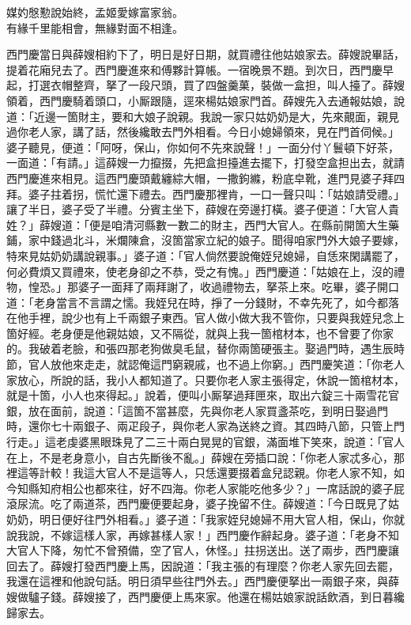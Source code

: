 \begin{myquote} 
媒妁慇懃說始終，孟姬愛嫁富家翁。\\有緣千里能相會，無緣對面不相逢。
\end{myquote} 

西門慶當日與薛嫂相約下了，明日是好日期，就買禮往他姑娘家去。薛嫂說畢話，提着花廂兒去了。西門慶進來和傅夥計算帳。一宿晚景不題。到次日，西門慶早起，打選衣帽整齊，拏了一段尺頭，買了四盤羹菓，裝做一盒担，叫人擡了。薛嫂領着，西門慶騎着頭口，小厮跟隨，逕來楊姑娘家門首。薛嫂先入去通報姑娘，說道：「近邊一箇財主，{}要和大娘子說親。我說一家只姑奶奶是大，先來覿面，親見過你老人家，講了話，{}然後纔敢去門外相看。今日小媳婦領來，見在門首伺候。」婆子聽見，便道：「阿呀，{}保山，你如何不先來說聲！」一面分付丫鬟頓下好茶，一面道：「有請。」這薛嫂一力攛掇，先把盒担擡進去擺下，打發空盒担出去，就請西門慶進來相見。這西門慶頭戴纏綜大帽，一撒鉤縧，粉底皁靴，進門見婆子拜四拜。婆子拄着拐，慌忙還下禮去。西門慶那裡肯，一口一聲只叫：「姑娘請受禮。」讓了半日，婆子受了半禮。分賓主坐下，薛嫂在旁邊打橫。婆子便道：「大官人貴姓？」薛嫂道：「便是咱清河縣數一數二的財主，西門大官人。在縣前開箇大生藥鋪，家中錢過北斗，米爛陳倉，沒箇當家立紀的娘子。聞得咱家門外大娘子要嫁，特來見姑奶奶講說親事。」婆子道：「官人倘然要說俺姪兒媳婦，自恁來閑講罷了，何必費煩又買禮來，使老身卻之不恭，受之有愧。」西門慶道：「姑娘在上，沒的禮物，惶恐。」那婆子一面拜了兩拜謝了，收過禮物去，拏茶上來。吃畢，婆子開口道：「老身當言不言謂之懦。{}我姪兒在時，掙了一分錢財，不幸先死了，如今都落在他手裡，說少也有上千兩銀子東西。官人做小做大我不管你，只要與我姪兒念上箇好經。老身便是他親姑娘，又不隔從，就與上我一箇棺材本，也不曾要了你家的。我破着老臉，和張四那老狗做臭毛鼠，替你兩箇硬張主。娶過門時，遇生辰時節，官人放他來走走，就認俺這門窮親戚，也不過上你窮。」{}西門慶笑道：「你老人家放心，所說的話，我小人都知道了。只要你老人家主張得定，休說一箇棺材本，就是十箇，小人也來得起。」說着，便叫小厮拏過拜匣來，取出六錠三十兩雪花官銀，放在面前，說道：「這箇不當甚麼，先與你老人家買盞茶吃，到明日娶過門時，還你七十兩銀子、兩疋段子，與你老人家為送終之資。其四時八節，只管上門行走。」這老虔婆黑眼珠見了二三十兩白晃晃的官銀，滿面堆下笑來，說道：「官人在上，不是老身意小，自古先斷後不亂。」薛嫂在旁插口說：「你老人家忒多心，那裡這等計較！我這大官人不是這等人，只恁還要掇着盒兒認親。你老人家不知，如今知縣知府相公也都來往，好不四海。你老人家能吃他多少？」一席話說的婆子屁滾尿流。吃了兩道茶，西門慶便要起身，婆子挽留不住。薛嫂道：「今日既見了姑奶奶，明日便好往門外相看。」婆子道：「我家姪兒媳婦不用大官人相，保山，你就說我說，不嫁這樣人家，再嫁甚樣人家！」西門慶作辭起身。婆子道：「老身不知大官人下降，匆忙不曾預備，空了官人，休怪。」拄拐送出。送了兩步，西門慶讓回去了。薛嫂打發西門慶上馬，因說道：「我主張的有理麼？你老人家先回去罷，我還在這裡和他說句話。明日須早些往門外去。」西門慶便拏出一兩銀子來，與薛嫂做驢子錢。薛嫂接了，西門慶便上馬來家。他還在楊姑娘家說話飲酒，到日暮纔歸家去。

